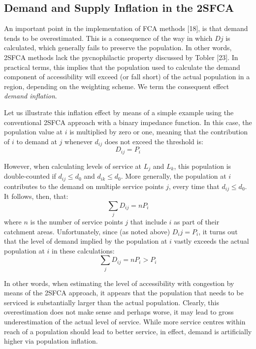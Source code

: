 \documentclass[10pt,letterpaper]{article}
\begin{document}
\subsection{Demand and Supply Inflation in the
2SFCA}\label{demand-and-supply-inflation-in-the-2sfca}

An important point in the implementation of FCA methods {[}18{]}, is
that demand tends to be overestimated. This is a consequence of the way
in which \(Dj\) is calculated, which generally fails to preserve the
population. In other words, 2SFCA methods lack the pycnophilactic
property discussed by Tobler {[}23{]}. In practical terms, this implies
that the population used to calculate the demand component of
accessibility will exceed (or fall short) of the actual population in a
region, depending on the weighting scheme. We term the consequent effect
\emph{demand inflation}.

Let us illustrate this inflation effect by means of a simple example
using the conventional 2SFCA approach with a binary impedance function.
In this case, the population value at \(i\) is multiplied by zero or
one, meaning that the contribution of \(i\) to demand at \(j\) whenever
\(d_{ij}\) does not exceed the threshold is: \[
D_{ij} = P_i
\]

However, when calculating levels of service at \(L_j\) and \(L_k\), this
population is double-counted if \(d_{ij} \le d_0\) and
\(d_{ik} \leq d_0\). More generally, the population at \(i\) contributes
to the demand on multiple service points \(j\), every time that
\(d_{ij} \le d_0\). It follows, then, that: \[
\sum_j D_{ij} = nP_i
\] where \(n\) is the number of service points \(j\) that include \(i\)
as part of their catchment areas. Unfortunately, since (as noted above)
\(D_ij = P_i\), it turns out that the level of demand implied by the
population at \(i\) vastly exceeds the actual population at \(i\) in
these calculations: \[
\sum_j D_{ij} = nP_i > P_i
\]

In other words, when estimating the level of accessibility with
congestion by means of the 2SFCA approach, it appears that the
population that needs to be serviced is substantially larger than the
actual population. Clearly, this overestimation does not make sense and
perhaps worse, it may lead to gross underestimation of the actual level
of service. While more service centres within reach of a population
should lead to better service, in effect, demand is artificially higher
via population inflation.
\end{document}
